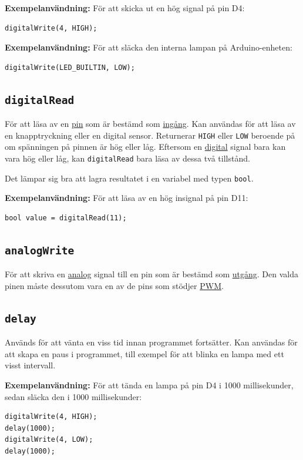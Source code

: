 \documentclass[11pt]{article}
\begin{document}
\textbf{Exempelanvändning:}
För att skicka ut en hög signal på pin D4:
\begin{lstlisting}
digitalWrite(4, HIGH);
\end{lstlisting}

\textbf{Exempelanvändning:}
För att släcka den interna lampan på Arduino-enheten:
\begin{lstlisting}
digitalWrite(LED_BUILTIN, LOW);
\end{lstlisting}

\subsection{\texttt{digitalRead}}
För att läsa av en \hyperref[sec:pin]{pin} som är bestämd som
\hyperref[sec:io]{ingång}. Kan användas för att läsa av en knapptryckning eller
en digital sensor. Returnerar \texttt{HIGH} eller \texttt{LOW} beroende på om
spänningen på pinnen är hög eller låg. Eftersom en
\hyperref[sec:analog-digital]{digital} signal bara kan vara hög eller låg, kan
\texttt{digitalRead} bara läsa av dessa två tillstånd.

Det lämpar sig bra att lagra resultatet i en variabel med typen \texttt{bool}.

\textbf{Exempelanvändning:}
För att läsa av en hög insignal på pin D11:
\begin{lstlisting}
bool value = digitalRead(11);
\end{lstlisting}

\subsection{\texttt{analogWrite}}
För att skriva en \hyperref[sec:analog-digital]{analog} signal till en pin som
är bestämd som \hyperref[sec:io]{utgång}. Den valda pinen måste dessutom vara
en
av de pins som stödjer \hyperref[sec:pwm]{PWM}.

\subsection{\texttt{delay}}
Används för att vänta en viss tid innan programmet fortsätter. Kan användas för
att skapa en paus i programmet, till exempel för att blinka en lampa med ett
visst intervall.

\textbf{Exempelanvändning:}
För att tända en lampa på pin D4 i 1000 millisekunder, sedan släcka den i 1000
millisekunder:

\begin{lstlisting}
digitalWrite(4, HIGH);
delay(1000);
digitalWrite(4, LOW);
delay(1000);
\end{lstlisting}
\end{document}
